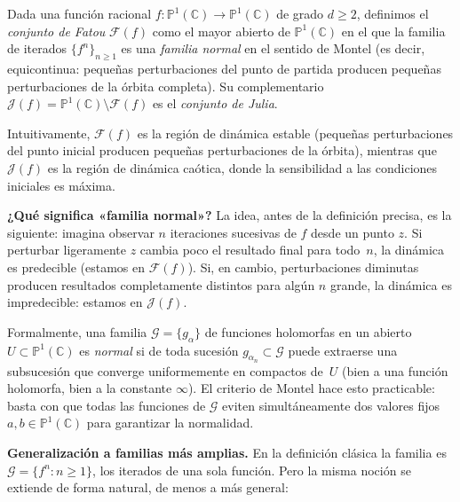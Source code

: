 \documentclass[11pt,a4paper]{article}
\theoremstyle{plain}
\theoremstyle{definition}
\theoremstyle{remark}
\newcommand{\Puno}{\mathbb{P}^1(\mathbb{C})}
\begin{document}
Dada una función racional $f:\Puno\to\Puno$ de grado $d\geq 2$,
definimos el \emph{conjunto de Fatou} $\mathcal{F}(f)$ como el mayor
abierto de $\Puno$ en el que la familia de iterados
$\{f^n\}_{n\geq 1}$ es una \emph{familia normal} en el sentido de Montel (es decir, equicontinua: pequeñas perturbaciones del punto de partida producen pequeñas perturbaciones de la órbita completa).
Su complementario $\mathcal{J}(f)=\Puno\setminus\mathcal{F}(f)$ es el
\emph{conjunto de Julia}.

Intuitivamente, $\mathcal{F}(f)$ es la región de dinámica estable
(pequeñas perturbaciones del punto inicial producen pequeñas
perturbaciones de la órbita), mientras que $\mathcal{J}(f)$ es la
región de dinámica caótica, donde la sensibilidad a las condiciones
iniciales es máxima.

\medskip
\noindent\textbf{¿Qué significa «familia normal»?}
La idea, antes de la definición precisa, es la siguiente: imagina
observar $n$ iteraciones sucesivas de $f$ desde un punto $z$.
Si perturbar ligeramente $z$ cambia poco el resultado final para todo~$n$,
la dinámica es predecible (estamos en $\mathcal{F}(f)$).
Si, en cambio, perturbaciones diminutas producen resultados completamente
distintos para algún $n$ grande, la dinámica es impredecible:
estamos en $\mathcal{J}(f)$.

Formalmente, una familia $\mathcal{G}=\{g_\alpha\}$ de funciones holomorfas
en un abierto $U\subset\Puno$ es \emph{normal} si de toda sucesión
$g_{\alpha_n}\subset\mathcal{G}$ puede extraerse una subsucesión que
converge uniformemente en compactos de~$U$ (bien a una función holomorfa,
bien a la constante $\infty$).
El criterio de Montel hace esto practicable: basta con que todas las
funciones de $\mathcal{G}$ eviten simultáneamente dos valores fijos
$a,b\in\Puno$ para garantizar la normalidad.

\medskip
\noindent\textbf{Generalización a familias más amplias.}
En la definición clásica la familia es $\mathcal{G}=\{f^n:n\geq 1\}$,
los iterados de una sola función.
Pero la misma noción se extiende de forma natural, de menos a más general:
\end{document}
